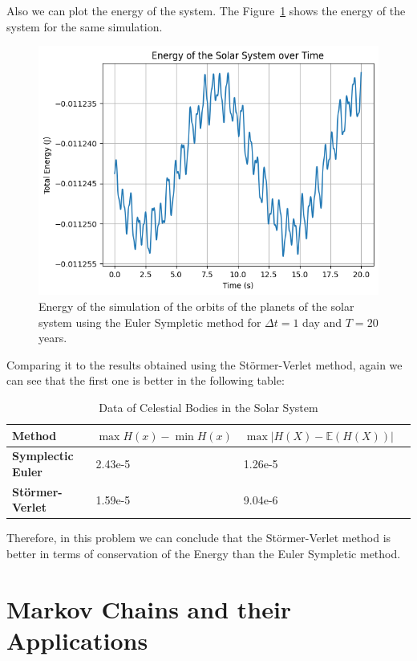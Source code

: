 \documentclass{report}
\begin{document}
Also we can plot the energy of the system. The Figure~\ref{fig:solarsystemenergyeuler} shows the energy of the system for the same simulation.

\begin{figure}[H]
	\centering
	\includegraphics[width=0.5\linewidth]{./Figures/SolarSystem/energy_euler.png}
	\caption{Energy of the simulation of the orbits of the planets of the solar system using the Euler Sympletic method for \(\Delta t = 1\) day and \(T = 20\) years.}
	\label{fig:solarsystemenergyeuler}
\end{figure}

Comparing it to the results obtained using the Störmer-Verlet method, again we can see that the first one is better in the following table:

\begin{table}[H]
	\centering
	\renewcommand{\arraystretch}{1.2} %
	\begin{tabular}{>{\bfseries}l >{\raggedleft}p{4cm} >{\raggedleft\arraybackslash}p{4cm} >{\raggedleft\arraybackslash}p{3cm}}
	\toprule
	\textbf{Method} & $\max{H(x)} - \min{H(x)}$  & $\max{|H(X) - \mathbb{E}(H(X))|}$\\
	\midrule
	Symplectic Euler & 2.43e-5 & 1.26e-5  \\
	Störmer-Verlet   & 1.59e-5 & 9.04e-6 \\
	\bottomrule
	\end{tabular}
	\caption{Data of Celestial Bodies in the Solar System}
	\label{table:comparison}
\end{table}

Therefore, in this problem we can conclude that the Störmer-Verlet method is better in terms of conservation of the Energy than the Euler Sympletic method.

\chapter{Markov Chains and their Applications}
\label{sec:markov_chains}
\end{document}
